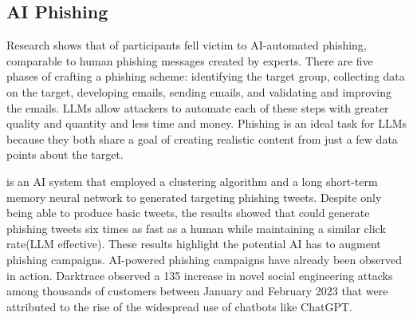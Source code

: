 \documentclass[10pt,twocolumn]{article}
\begin{document}
\subsection{AI Phishing}
Research shows that  of participants fell victim to AI-automated phishing, comparable to human phishing messages created by experts. There are five phases of crafting a phishing scheme: identifying the target group, collecting data on the target, developing emails, sending emails, and validating and improving the emails. LLMs allow attackers to automate each of these steps with greater quality and quantity and less time and money. Phishing is an ideal task for LLMs because they both share a goal of creating realistic content from just a few data points about the target. 

 is an AI system that employed a clustering algorithm and a long short-term memory neural network to generated targeting phishing tweets. Despite only being able to produce basic tweets, the results showed that  could generate phishing tweets six times as fast as a human while maintaining a similar click rate(LLM effective). These results highlight the potential AI has to augment phishing campaigns. AI-powered phishing campaigns have already been observed in action. Darktrace observed a 135 increase in novel social engineering attacks among thousands of customers between January and February 2023 that were attributed to the rise of the widespread use of chatbots like ChatGPT.\cite{llm_vs_human}
\end{document}
